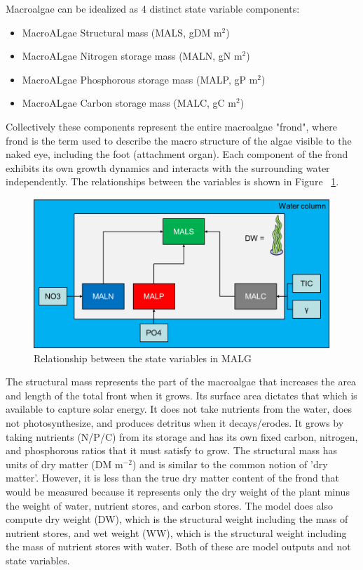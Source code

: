 \documentclass{deltares_manual}
\begin{document}
Macroalgae can be idealized as 4 distinct state variable components:
\begin{itemize}
\item MacroALgae Structural mass (MALS, gDM m$^{2}$)
\item MacroALgae Nitrogen storage mass (MALN, gN m$^{2}$)
\item MacroALgae Phosphorous storage mass (MALP, gP m$^{2}$)
\item MacroALgae Carbon storage mass (MALC, gC m$^{2}$)
\end{itemize}
Collectively these components represent the entire macroalgae "frond", where frond is the term used to describe the macro structure of the algae visible to the naked eye, including the foot (attachment organ). Each component of the frond exhibits its own growth dynamics and interacts with the surrounding water independently. The relationships between the variables is shown in Figure ~\ref{fig:statevariables}.
\begin{figure}[H]
	\centering
	\includegraphics[width=1\linewidth]{figures/state_variables}
	\caption{Relationship between the state variables in MALG}
	\label{fig:statevariables}
\end{figure}
The structural mass represents the part of the macroalgae that increases the area and length of the total front when it grows. Its surface area dictates that which is available to capture solar energy. It does not take nutrients from the water, does not photosynthesize, and produces detritus when it decays/erodes. It grows by taking nutrients (N/P/C) from its storage and has its own fixed carbon, nitrogen, and phosphorous ratios that it must satisfy to grow. The structural mass has units of dry matter (DM m$^{-2}$) and is similar to the common notion of 'dry matter'. However, it is less than the true dry matter content of the frond that would be measured because it represents only the dry weight of the plant minus the weight of water, nutrient stores, and carbon stores. The model does also compute dry weight (DW), which is the structural weight including the mass of nutrient stores, and wet weight (WW), which is the structural weight including the mass of nutrient stores with water. Both of these are model outputs and not state variables.
 
\end{document}
